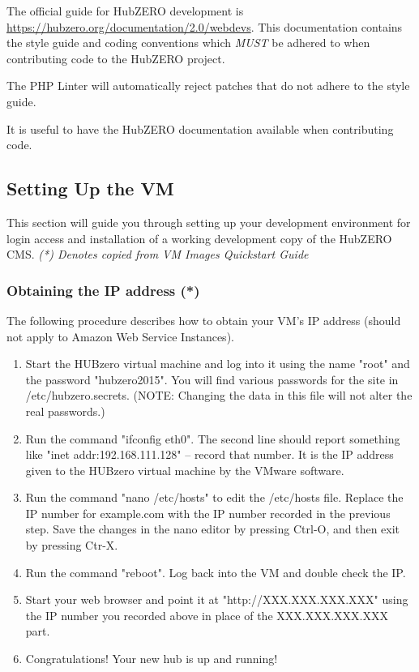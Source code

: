 \documentclass[10pt,letterpaper,titlepage]{article}
\begin{document}
The official guide for HubZERO development is \url{https://hubzero.org/documentation/2.0/webdevs}. This documentation contains the style guide and coding conventions which \emph{MUST} be adhered to when contributing code
to the HubZERO project.

The PHP Linter will automatically reject patches that do not adhere to the style guide. 

It is useful to have the HubZERO documentation available when contributing code.


\subsection{Setting Up the VM}
This section will guide you through setting up your development environment for login access and installation of a working development copy of the HubZERO CMS.
\textit{(*) Denotes copied from VM Images Quickstart Guide}
\subsubsection{Obtaining the IP address (*)}
The following procedure describes how to obtain your VM's IP address (should not apply to Amazon Web Service Instances).
\begin{enumerate}
\item Start the HUBzero virtual machine and log into it using the name "root" and the password "hubzero2015". You will find various passwords for the site in /etc/hubzero.secrets. (NOTE: Changing the data in this file will not alter the real passwords.)
\item Run the command "ifconfig eth0". The second line should report something like "inet addr:192.168.111.128" -- record that number. It is the IP address given to the HUBzero virtual machine by the VMware software.
\item Run the command "nano /etc/hosts" to edit the /etc/hosts file. Replace the IP number for example.com with the IP number recorded in the previous step. Save the changes in the nano editor by pressing Ctrl-O, and then exit by pressing Ctr-X.
\item Run the command "reboot". Log back into the VM and double check the IP.
\item Start your web browser and point it at "http://XXX.XXX.XXX.XXX" using the IP number you recorded above in place of the XXX.XXX.XXX.XXX part.
\item Congratulations! Your new hub is up and running!
\end{enumerate}
\end{document}

